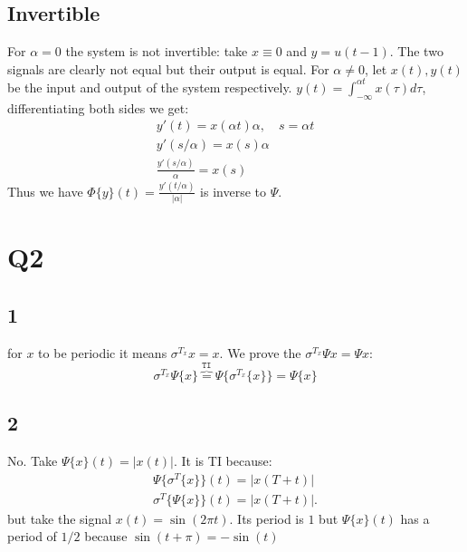 \subsection{Invertible}
For $\alpha=0$ the system is not invertible: take $x\equiv 0$ and $y=u(t-1)$. The two signals are clearly not equal but their output is equal. For $\alpha\neq 0$, let $x(t),y(t)$ be the input and output of the system respectively. $y(t)=\int_{-\infty}^{\alpha t}x(\tau)d\tau$, differentiating both sides we get:
\begin{align*}
    y'(t)=x(\alpha t)\alpha,\quad s=\alpha t\\
    y'(s/\alpha)=x(s)\alpha\\
    \frac{y'(s/\alpha)}{\alpha}=x(s)
\end{align*}
Thus we have $\Phi\{y\}(t)=\frac{y'(t/\alpha)}{|\alpha|}$ is inverse to $\Psi$.

\section{Q2}
\subsection{1}
for $x$ to be periodic it means $\sigma^{T_x}x=x$. We prove the $\sigma^{T_x}\Psi{x}=\Psi{x}$:
\begin{equation}
    \sigma^{T_x}\Psi\{x\}\overbrace{=}^\texttt{TI}
    \Psi\{\sigma^{T_x}\{x\}\}=\Psi\{x\}
\end{equation}
\subsection{2}
No. Take $\Psi\{x\}(t)=|x(t)|$. It is TI because:
\begin{align*}
    \Psi\{\sigma^T\{x\}\}(t)=|x(T+t)|\\
    \sigma^T\{\Psi\{x\}\}(t)=|x(T+t)|.
\end{align*}
but take the signal $x(t)=\sin(2\pi t)$. Its period is $1$ but $\Psi\{x\}(t)$ has a period of $1/2$ because $\sin(t+\pi)=-\sin(t)$
